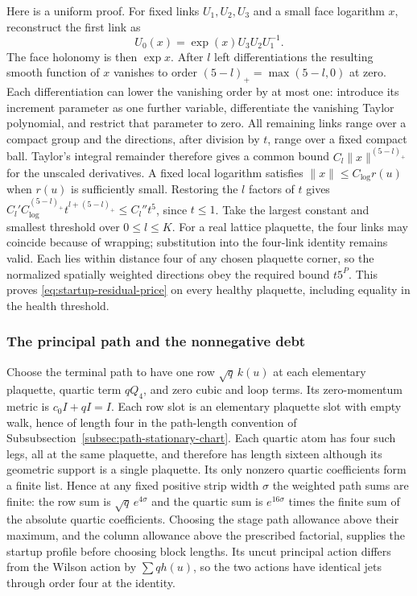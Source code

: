 Here is a uniform proof. For fixed links $U_1,U_2,U_3$ and a small
face logarithm $x$, reconstruct the first link as
\[
             U_0(x)=\exp(x)U_3U_2U_1^{-1}.
\]
The face holonomy is then $\exp x$. After $l$ left differentiations
the resulting smooth function of $x$ vanishes to order
$(5-l)_+=\max(5-l,0)$ at zero. Each differentiation can lower the
vanishing order by at most one: introduce its increment parameter
as one further variable, differentiate the vanishing Taylor
polynomial, and restrict that parameter to zero. All remaining
links range over a compact group and the directions, after division
by $t$, range over a fixed compact ball. Taylor's integral remainder
therefore gives a common bound $C_l\|x\|^{(5-l)_+}$ for the
unscaled derivatives. A fixed local logarithm satisfies
$\|x\|\le C_{\log}r(u)$ when $r(u)$ is sufficiently small.
Restoring the $l$ factors of $t$ gives
$C_l'C_{\log}^{(5-l)_+}t^{l+(5-l)_+}\le C_l''t^5$,
since $t\le1$. Take the largest constant and smallest threshold
over $0\le l\le K$. For a real lattice plaquette, the four links
may coincide because of wrapping; substitution into the four-link
identity remains valid. Each lies within distance four of any
chosen plaquette corner, so the normalized spatially weighted
directions obey the required bound $t5^P$. This proves
\eqref{eq:startup-residual-price} on every healthy plaquette,
including equality in the health threshold.

\subsubsection{The principal path and the nonnegative debt}
Choose the terminal path to have one row
$\sqrt q\,k(u)$ at each elementary plaquette, quartic term $qQ_4$,
and zero cubic and loop terms. Its zero-momentum metric is
$c_0I+qI=I$. Each row slot is an elementary plaquette slot with empty
walk, hence of length four in the path-length convention of
Subsubsection~\ref{subsec:path-stationary-chart}. Each quartic atom has four
such legs, all at the same plaquette, and therefore has length
sixteen although its geometric support is a single plaquette. Its only
nonzero quartic coefficients form a finite list. Hence at any fixed
positive strip width $\sigma$ the weighted path sums are finite: the
row sum is $\sqrt q\,e^{4\sigma}$ and the quartic sum is $e^{16\sigma}$
times the finite sum of the absolute quartic coefficients. Choosing
the stage path allowance above their maximum, and the column
allowance above the prescribed factorial, supplies the startup
profile before choosing block lengths. Its uncut principal action
differs from the Wilson action by $\sum qh(u)$, so the two actions
have identical jets through order four at the identity.

